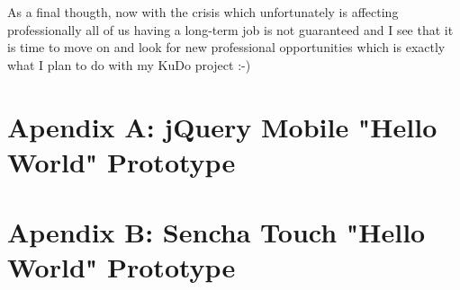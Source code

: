 \documentclass[a4paper,12pt]{book}
\begin{document}
As a final thougth, now with the crisis which unfortunately is affecting professionally all of us having a long-term job is not guaranteed and I see that it is time to move on and look for new professional opportunities which is exactly what I plan to do with my KuDo project :-)


\chapter{Apendix A: jQuery Mobile "Hello World" Prototype}
\label{Apendix A: jQuery Mobile "Hello World" Prototype}


\chapter{Apendix B: Sencha Touch "Hello World" Prototype}
\label{Apendix B: Sencha Touch "Hello World" Prototype}

\end{document}
